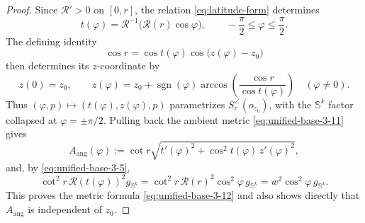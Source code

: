 \documentclass[11pt,reqno]{amsart}
\theoremstyle{definition}
\numberwithin{equation}{section}
\DeclareMathOperator{\sgn}{sgn}
\begin{document}
\begin{proof}
 Since
 $\mathcal R'>0$ on $[0,r]$, the relation \eqref{eq:latitude-form}
 determines
 \begin{equation}\label{eq:def of t varphi}
    t(\varphi)=\mathcal R^{-1}
       \bigl(\mathcal R(r)\cos\varphi\bigr),
  \qquad -\frac\pi2\le\varphi\le\frac\pi2.
 \end{equation}
 The defining identity
 \[
  \cos r
  =\cos t(\varphi)\cos\bigl(z(\varphi)-z_0\bigr)
 \]
 then determines its \(z\)-coordinate by
 \begin{equation}\label{eq:def of z varphi}
     z(0)=z_0,
  \qquad
  z(\varphi)=z_0+\sgn(\varphi)
       \arccos\!\left(\frac{\cos r}{\cos t(\varphi)}\right)
       \quad (\varphi\ne0).
 \end{equation}
 Thus $(\varphi,p)\mapsto(t(\varphi),z(\varphi),p)$ parametrizes
 $S_r^{\angle}(o_{z_0})$, with the $\mathbb S^k$ factor collapsed at
 $\varphi=\pm\pi/2$.  Pulling back the ambient metric
 \eqref{eq:unified-base-3-11} gives
 \begin{equation}\label{eq:def of A ang}
    A_{\mathrm{ang}}(\varphi)
  :=\cot r\sqrt{t'(\varphi)^2
                +\cos^2t(\varphi)\,z'(\varphi)^2},
 \end{equation}
 and, by \eqref{eq:unified-base-3-5},
 \[
  \cot^2r\,\mathcal R(t(\varphi))^2g_{\mathbb S^k}
  =\cot^2r\,\mathcal R(r)^2\cos^2\varphi\,g_{\mathbb S^k}
  =w^2\cos^2\varphi\,g_{\mathbb S^k}.
 \]
 This proves the metric formula \eqref{eq:unified-base-3-12} and also
 shows directly that $A_{\mathrm{ang}}$ is independent of $z_0$.


\end{proof}
\end{document}
